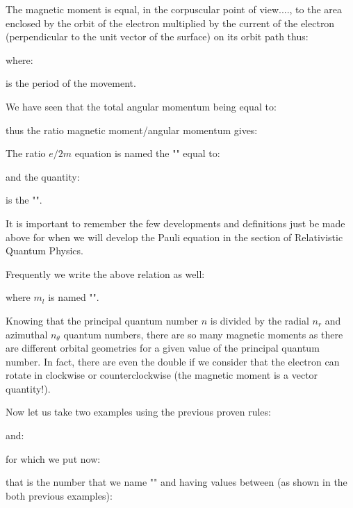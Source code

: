 	The magnetic moment is equal, in the corpuscular point of view...., to the area enclosed by the orbit of the electron multiplied by the current of the electron (perpendicular to the unit vector of the surface) on its orbit path thus:
	
	where:
	
	is the period of the movement.
	
	We have seen that the total angular momentum being equal to:
     
      thus the ratio magnetic moment/angular momentum gives:
      
      The ratio $e/2m$ equation is named the "" equal to:
      
     and the quantity:
     
     is the "".
    \begin{tcolorbox}[title=Remark,colframe=black,arc=10pt]
	It is important to remember the few developments and definitions just be made above for when we will develop the Pauli equation in the section of Relativistic Quantum Physics.
	\end{tcolorbox}
	Frequently we write the above relation as well:
    
     where $m_l$ is named "". 
     
     Knowing that the principal quantum number $n$ is divided by the radial $n_r$ and azimuthal $n_\theta$ quantum numbers, there are so many magnetic moments as there are different orbital geometries for a given value of the principal quantum number. In fact, there are even the double if we consider that the electron can rotate in clockwise or counterclockwise (the magnetic moment is a vector quantity!).
     
     Now let us take two examples using the previous proven rules:
    
     and:
     
    for which we put now:
    
     that is the number that we name "" and having values between (as shown in the both previous examples):
     
